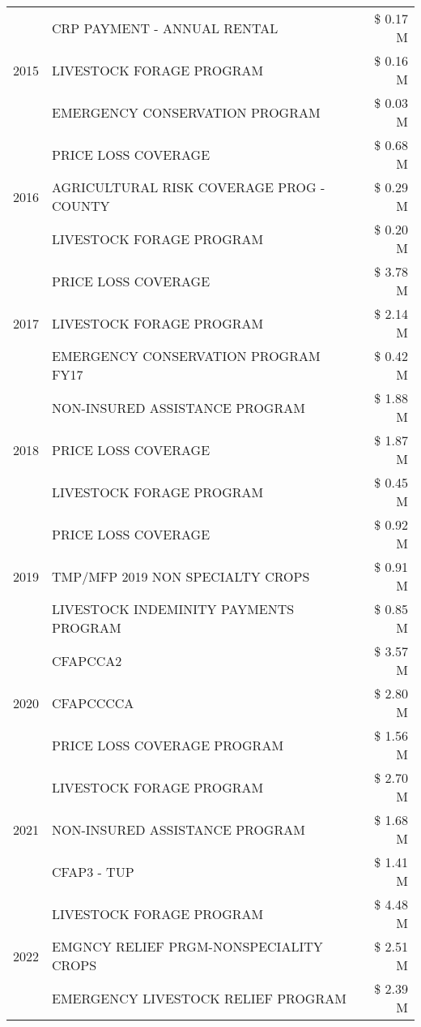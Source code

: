 \begin{tabular}{llr}
\cline{1-3}
\multirow[t]{3}{*}{2015} & CRP PAYMENT - ANNUAL RENTAL & \$ 0.17 M \\
 & LIVESTOCK FORAGE PROGRAM & \$ 0.16 M \\
 & EMERGENCY CONSERVATION PROGRAM & \$ 0.03 M \\
\cline{1-3}
\multirow[t]{3}{*}{2016} & PRICE LOSS COVERAGE & \$ 0.68 M \\
 & AGRICULTURAL RISK COVERAGE PROG - COUNTY & \$ 0.29 M \\
 & LIVESTOCK FORAGE PROGRAM & \$ 0.20 M \\
\cline{1-3}
\multirow[t]{3}{*}{2017} & PRICE LOSS COVERAGE & \$ 3.78 M \\
 & LIVESTOCK FORAGE PROGRAM & \$ 2.14 M \\
 & EMERGENCY CONSERVATION PROGRAM FY17 & \$ 0.42 M \\
\cline{1-3}
\multirow[t]{3}{*}{2018} & NON-INSURED ASSISTANCE PROGRAM & \$ 1.88 M \\
 & PRICE LOSS COVERAGE & \$ 1.87 M \\
 & LIVESTOCK FORAGE PROGRAM & \$ 0.45 M \\
\cline{1-3}
\multirow[t]{3}{*}{2019} & PRICE LOSS COVERAGE & \$ 0.92 M \\
 & TMP/MFP 2019 NON SPECIALTY CROPS & \$ 0.91 M \\
 & LIVESTOCK INDEMINITY PAYMENTS PROGRAM & \$ 0.85 M \\
\cline{1-3}
\multirow[t]{3}{*}{2020} & CFAPCCA2 & \$ 3.57 M \\
 & CFAPCCCCA & \$ 2.80 M \\
 & PRICE LOSS COVERAGE PROGRAM & \$ 1.56 M \\
\cline{1-3}
\multirow[t]{3}{*}{2021} & LIVESTOCK FORAGE PROGRAM & \$ 2.70 M \\
 & NON-INSURED ASSISTANCE PROGRAM & \$ 1.68 M \\
 & CFAP3 - TUP & \$ 1.41 M \\
\cline{1-3}
\multirow[t]{3}{*}{2022} & LIVESTOCK FORAGE PROGRAM & \$ 4.48 M \\
 & EMGNCY RELIEF PRGM-NONSPECIALITY CROPS & \$ 2.51 M \\
 & EMERGENCY LIVESTOCK RELIEF PROGRAM & \$ 2.39 M \\
\cline{1-3}
\bottomrule
\end{tabular}
